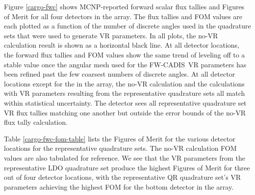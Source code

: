 \documentclass{article} %
\newcommand{\fwc}{\mbox{FW-CADIS}}
\begin{document}
Figure \ref{cargo-fwc} shows MCNP-reported forward scalar flux tallies and
Figures of Merit for all four detectors in the array. The flux tallies and FOM
values are each plotted as a function of the number of discrete angles used in
the quadrature sets that were used to generate VR parameters. In all plots,
the no-VR calculation result is shown as a horizontal black line. At all
detector locations, the forward flux tallies and FOM values show the same
trend of leveling off to a stable value once the angular mesh used for the
\fwc\ VR parameters has been refined past the few coarsest numbers of discrete
angles. At all detector locations except for the  in the array, the 
no-VR calculation and the calculations with VR parameters resulting from the
representative quadrature sets all match within statistical uncertainty. The
 detector sees all representative quadrature set VR flux tallies
matching one another but outside the error bounds of the no-VR flux tally
calculation.

Table \ref{cargo-fwc-fom-table} lists the Figures of Merit for the various
detector locations for the representative quadrature sets. The no-VR
calculation FOM values are also tabulated for reference. We see that the
VR parameters from the representative LDO quadrature set produce the
highest Figures of Merit for three out of four detector locations, with the
representative QR quadrature set's VR parameters achieving the highest FOM
for the bottom detector in the array.
\end{document}
